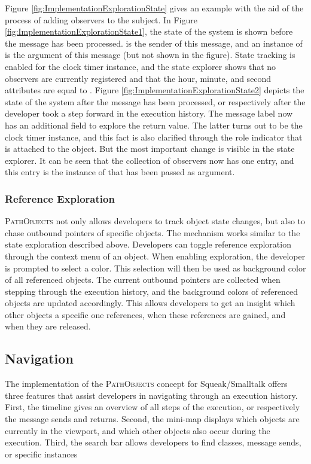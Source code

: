Figure \ref{fig:ImplementationExplorationState} gives an example with the aid of the process of adding observers to the subject.
In Figure \ref{fig:ImplementationExplorationState1}, the state of the system is shown before the  message has been processed.
 is the sender of this message, and an instance of  is the argument of this message (but not shown in the figure).
State tracking is enabled for the clock timer instance, and the state explorer shows that no observers are currently registered and that the hour, minute, and second attributes are equal to .
Figure \ref{fig:ImplementationExplorationState2} depicts the state of the system after the  message has been processed, or respectively after the developer took a step forward in the execution history.
The message label now has an additional field to explore the return value.
The latter turns out to be the clock timer instance, and this fact is also clarified through the role indicator that is attached to the object.
But the most important change is visible in the state explorer.
It can be seen that the collection of observers now has one entry, and this entry is the instance of  that has been passed as argument.

\subsubsection{Reference Exploration}
\textsc{PathObjects} not only allows developers to track object state changes, but also to chase outbound pointers of specific objects.
The mechanism works similar to the state exploration described above.
Developers can toggle reference exploration through the context menu of an object.
When enabling exploration, the developer is prompted to select a color.
This selection will then be used as background color of all referenced objects.
The current outbound pointers are collected when stepping through the execution history, and the background colors of referenced objects are updated accordingly.
This allows developers to get an insight which other objects a specific one references, when these references are gained, and when they are released.


\subsection{Navigation}
\label{ss:ImplementationNavigation}
The implementation of the \textsc{PathObjects} concept for Squeak/Smalltalk offers three features that assist developers in navigating through an execution history.
First, the timeline gives an overview of all steps of the execution, or respectively the message sends and returns.
Second, the mini-map displays which objects are currently in the viewport, and which other objects also occur during the execution.
Third, the search bar allows developers to find classes, message sends, or specific instances


